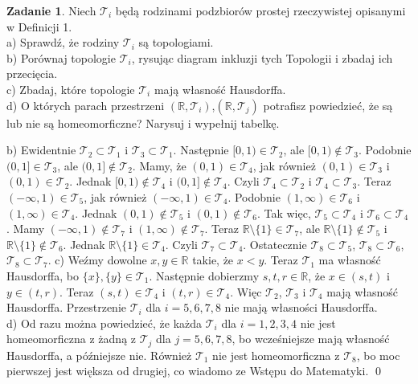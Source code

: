 \documentclass{article}
\theoremstyle{definition}%
\theoremstyle{theorem}
\newtheorem{zad}{Zadanie}
\renewenvironment{proof}{{\bfseries Rozwiązanie}}{\qed}
\begin{document}
	\begin{zad}
		Niech $\mathcal{T}_{i}$ będą rodzinami podzbiorów prostej rzeczywistej opisanymi w Definicji 1.\\
		a) Sprawdź, że rodziny $\mathcal{T}_{i}$ są topologiami.\\
		b) Porównaj topologie $\mathcal{T}_{i}$, rysując diagram inkluzji tych Topologii i zbadaj ich przecięcia.\\
		c) Zbadaj, które topologie $\mathcal{T}_{i}$ mają własność Hausdorffa.\\
		d) O których parach przestrzeni $(\mathbb{R},\mathcal{T}_{i})$,$(\mathbb{R},\mathcal{T}_{j})$ potrafisz powiedzieć, że są lub nie są homeomorficzne? Narysuj i wypełnij tabelkę.
	\end{zad}
	\begin{proof}
	b) Ewidentnie $\mathcal{T}_{2}\subset\mathcal{T}_{1}$ i $\mathcal{T}_{3}\subset\mathcal{T}_{1}$. Następnie $[0,1)\in\mathcal{T}_{2}$, ale $[0,1)\not\in\mathcal{T}_{3}$. Podobnie $(0,1]\in\mathcal{T}_{3}$, ale $(0,1]\not\in\mathcal{T}_{2}$. Mamy, że $(0,1)\in\mathcal{T}_{4}$, jak również $(0,1)\in\mathcal{T}_{3}$ i $(0,1)\in\mathcal{T}_{2}$. Jednak $[0,1)\not\in\mathcal{T}_{4}$ i $(0,1]\not\in\mathcal{T}_{4}$. Czyli $\mathcal{T}_{4}\subset\mathcal{T}_{2}$ i $\mathcal{T}_{4}\subset\mathcal{T}_{3}$. Teraz $(-\infty,1)\in\mathcal{T}_{5}$, jak również $(-\infty,1)\in\mathcal{T}_{4}$. Podobnie $(1, \infty)\in\mathcal{T}_{6}$ i $(1, \infty)\in\mathcal{T}_{4}$. Jednak $(0,1)\not\in\mathcal{T}_{5}$ i $(0,1)\not\in\mathcal{T}_{6}$. Tak więc, $\mathcal{T}_{5}\subset\mathcal{T}_{4}$ i $\mathcal{T}_{6}\subset\mathcal{T}_{4}$. Mamy $(-\infty,1)\not\in\mathcal{T}_{7}$ i $(1, \infty)\not\in\mathcal{T}_{7}$. Teraz $\mathbb{R}\setminus\{1\}\in\mathcal{T}_{7}$, ale $\mathbb{R}\setminus\{1\}\not\in\mathcal{T}_{5}$ i $\mathbb{R}\setminus\{1\}\not\in\mathcal{T}_{6}$. Jednak $\mathbb{R}\setminus\{1\}\in\mathcal{T}_{4}$. Czyli $\mathcal{T}_{7}\subset\mathcal{T}_{4}$. Ostatecznie $\mathcal{T}_{8}\subset\mathcal{T}_{5}$, $\mathcal{T}_{8}\subset\mathcal{T}_{6}$,
	$\mathcal{T}_{8}\subset\mathcal{T}_{7}$.
	c) Weźmy dowolne $x,y\in\mathbb{R}$ takie, że $x<y$. Teraz $\mathcal{T}_{1}$ ma własność Hausdorffa, bo $\{x\},\{y\}\in\mathcal{T}_{1}$. Następnie dobierzmy $s,t,r\in\mathbb{R}$, że $x\in(s,t)$ i $y\in(t,r)$. Teraz  $(s,t)\in\mathcal{T}_{4}$ i $(t,r)\in\mathcal{T}_{4}$. Więc $\mathcal{T}_{2}$, $\mathcal{T}_{3}$ i $\mathcal{T}_{4}$ mają własność Hausdorffa.
	Przestrzenie $\mathcal{T}_{i}$ dla $i=5,6,7,8$ nie mają własności Hausdorffa.\\
	d) Od razu można powiedzieć, że każda $\mathcal{T}_{i}$ dla $i=1,2,3,4$ nie jest homeomorficzna z żadną z $\mathcal{T}_{j}$ dla $j=5,6,7,8$, bo wcześniejsze mają własność Hausdorffa, a późniejsze nie. Również $\mathcal{T}_{1}$ nie jest homeomorficzna z $\mathcal{T}_{8}$, bo moc pierwszej jest większa od drugiej, co wiadomo ze Wstępu do Matematyki.
	\end{proof}
	
\end{document}
